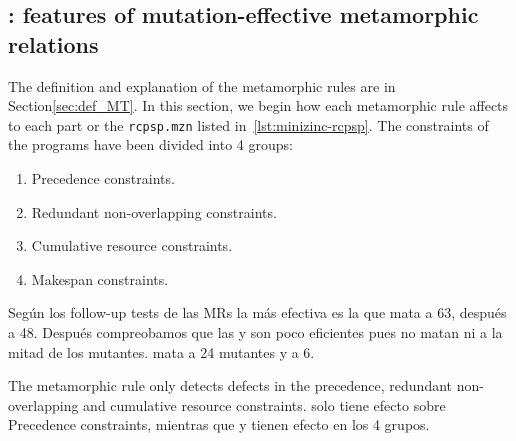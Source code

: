 \subsection{\rqidentifying: features of mutation-effective metamorphic relations}
The definition and explanation of the metamorphic rules are in
Section\ref{sec:def_MT}. In this section, we begin how each
metamorphic rule affects to each part or the \lstinline|rcpsp.mzn|
listed in~\ref{lst:minizinc-rcpsp}. The constraints of the programs
have been divided into 4 groups:
\begin{enumerate}
\item\label{item:precdence} Precedence constraints.
\item\label{item:redundant} Redundant non-overlapping constraints.
\item\label{item:cumulative} Cumulative resource constraints.
\item\label{item:makespan} Makespan constraints.
\end{enumerate}

Según los follow-up tests de las MRs la más efectiva es la  que mata a 63, después  a 48. Después compreobamos que las  y  son poco eficientes pues no matan ni a la mitad de los mutantes. 
 mata a 24 mutantes y    a 6.

The metamorphic rule  only detects defects in the precedence, redundant non-overlapping and cumulative resource constraints.
 solo tiene efecto sobre Precedence constraints, mientras que  y  tienen efecto en los 4 grupos. 





